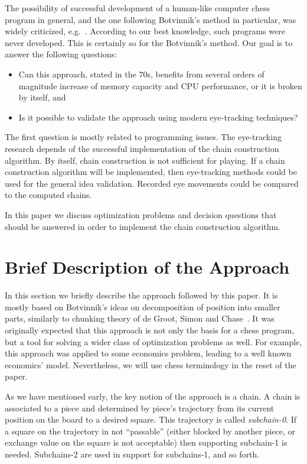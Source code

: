 \documentclass{llncs}
\begin{document}
The possibility of successful development of a human-like computer chess
program in general, and the one following Botvinnik's method in
particular, was widely criticized, e.g.~\cite{Berliner:1993:Playing}.
According to our best knowledge, such programs were never developed. This is certainly so for the Botvinnik's method. Our goal is to answer the following questions:
\begin{itemize}
\item Can this approach, stated in the 70s, benefits from
several orders of magnitude increase of memory capacity and CPU
performance, or it is broken by itself, and
\item Is it possible to validate the approach using modern eye-tracking techniques?
\end{itemize}
The first question is mostly related to programming issues. The eye-tracking research depends of the successful implementation of the chain construction algorithm. By itself, chain construction is not sufficient for playing. If a chain construction algorithm will be implemented, then eye-tracking methods could be used for the general idea validation. Recorded eye movements could be compared to the computed chains.

In this paper we discuss optimization problems and decision
questions that should be answered in order to implement the chain
construction algorithm.





\section{Brief Description of the Approach}\label{sec:general}
In this section we briefly describe the approach followed by this
paper. It is mostly based on Botvinnik's ideas on decomposition of
position into smaller parts, similarly to chunking theory of de Groot,
Simon and Chase~\cite{degroot:tcc65,chase1973perception}. It was originally expected that this approach is not
only the basis for a chess program, but a tool for solving a wider
class of optimization problems as well. For example, this approach was
applied to some economics problem, leading to a well known economics'
model. Nevertheless, we will use chess terminology in the reset of the
paper.

As we have mentioned early, the key notion of the approach is a chain.
A chain is associated to a piece and determined by piece's trajectory
from its current position on the board to a desired square. This
trajectory is called \emph{subchain-0}. If a square on the trajectory
in not ``passable'' (either blocked by another piece, or exchange
value on the square is not acceptable) then supporting subchain-1 is
needed. Subchains-2 are used in support for subchains-1, and so forth.
\end{document}
